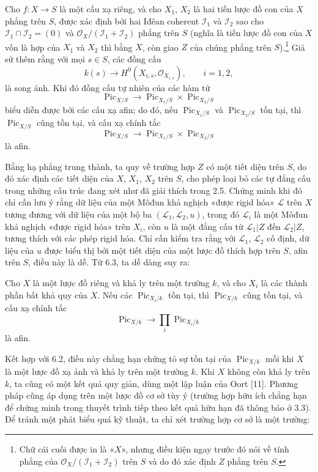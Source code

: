  Cho $f:X\longrightarrow S$ là một cấu xạ riêng, và cho
$X_1$, $X_2$ là hai tiền lược đồ con của $X$ phẳng trên $S$, được xác định bởi
hai Iđêan coherent $\mathcal I_1$ và $\mathcal I_2$ sao cho
$\mathcal I_1\cap\mathcal I_2=(0)$ và
$\mathcal O_X/(\mathcal I_1+\mathcal I_2)$ phẳng trên $S$ (nghĩa là tiền lược
đồ con của $X$ vốn là hợp của $X_1$ và $X_2$ thì bằng $X$, còn giao $Z$ của chúng
phẳng trên $S$).\footnote{Chữ cái cuối được in là «$X$», nhưng điều kiện ngay
trước đó nói về tính phẳng của $\mathcal O_X/(\mathcal I_1+\mathcal I_2)$ trên
$S$ và do đó xác định $Z$ phẳng trên $S$.} Giả sử thêm rằng với mọi $s\in S$,
các đồng cấu
\[
k(s)\longrightarrow H^0(X_{i,s},\mathcal O_{X_{i,s}}),\qquad i=1,2,
\]
là song ánh. Khi đó đồng cấu tự nhiên của các hàm tử
\[
\operatorname{Pic}_{X/S}\longrightarrow
\operatorname{Pic}_{X_1/S}\times\operatorname{Pic}_{X_2/S}
\]
biểu diễn được bởi các cấu xạ afin; do đó, nếu
$\operatorname{Pic}_{X_1/S}$ và $\operatorname{Pic}_{X_2/S}$ tồn tại, thì
$\operatorname{Pic}_{X/S}$ cũng tồn tại, và cấu xạ chính tắc
\[
\operatorname{Pic}_{X/S}\longrightarrow
\operatorname{Pic}_{X_1/S}\times\operatorname{Pic}_{X_2/S}
\]
là afin.

Bằng hạ phẳng trung thành, ta quy về trường hợp $Z$ có một tiết diện trên $S$,
do đó xác định các tiết diện của $X$, $X_1$, $X_2$ trên $S$, cho phép loại bỏ
các tự đẳng cấu trong những cấu trúc đang xét như đã giải thích trong 2.5.
Chứng minh khi đó chỉ cần lưu ý rằng dữ liệu của một Môđun khả nghịch
«được rigid hóa» $\mathcal L$ trên $X$ tương đương với dữ liệu của một bộ ba
$(\mathcal L_1,\mathcal L_2,u)$, trong đó $\mathcal L_i$ là một Môđun khả
nghịch «được rigid hóa» trên $X_i$, còn $u$ là một đẳng cấu từ
$\mathcal L_1|Z$ đến $\mathcal L_2|Z$, tương thích với các phép rigid hóa. Chỉ
cần kiểm tra rằng với $\mathcal L_1$, $\mathcal L_2$ cố định, dữ liệu của $u$
được biểu thị bởi một tiết diện của một lược đồ thích hợp trên $S$, afin trên
$S$, điều này là dễ. Từ 6.3, ta dễ dàng suy ra:

 Cho $X$ là một lược đồ riêng và khả ly trên một trường
$k$, và cho $X_i$ là các thành phần bất khả quy của $X$. Nếu các
$\operatorname{Pic}_{X_i/k}$ tồn tại, thì $\operatorname{Pic}_{X/k}$ cũng tồn
tại, và cấu xạ chính tắc
\[
\operatorname{Pic}_{X/k}\longrightarrow\prod_i\operatorname{Pic}_{X_i/k}
\]
là afin.

Kết hợp với 6.2, điều này chẳng hạn chứng tỏ sự tồn tại của
$\operatorname{Pic}_{X/k}$ mỗi khi $X$ là một lược đồ xạ ảnh và khả ly trên
một trường $k$. Khi $X$ không còn khả ly trên $k$, ta cũng có một kết quả quy
giản, dùng một lập luận của Oort [11]. Phương pháp cũng áp dụng trên một lược đồ
cơ sở tùy ý (trường hợp hữu ích chẳng hạn để chứng minh trong thuyết trình tiếp
theo kết quả hữu hạn đã thông báo ở 3.3). Để tránh một phát biểu quá kỹ thuật,
ta chỉ xét trường hợp cơ sở là một trường:

